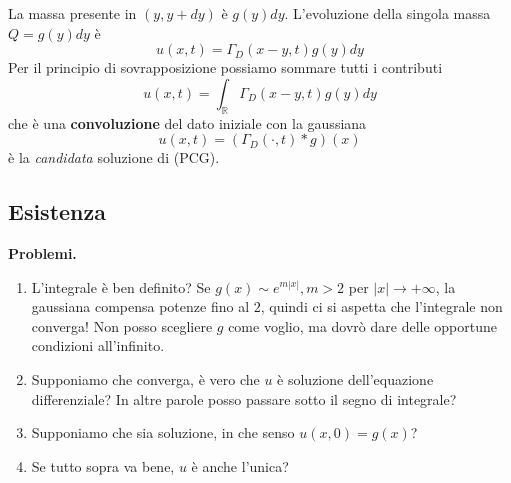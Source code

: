 \documentclass[10pt,a4paper,twoside,openright]{book}
\begin{document}
La massa presente in $(y,y+dy)$ è $g(y) dy$. L'evoluzione della singola massa $Q=g(y) dy$ è
\begin{equation*}
u(x,t) =\Gamma _{D}(x-y,t) g(y) dy
\end{equation*}
Per il principio di sovrapposizione possiamo sommare tutti i contributi
\begin{equation*}
u(x,t) =\int _{\mathbb{R}} \Gamma _{D}(x-y,t) g(y) dy
\end{equation*}
che è una \textbf{convoluzione} del dato iniziale con la gaussiana
\begin{equation*}
u(x,t) =( \Gamma _{D}(\cdotp,t) *g)(x)
\end{equation*}
è la \textit{candidata} soluzione di (PCG).
\subsection{Esistenza}

\textbf{Problemi.}
\begin{enumerate}
\item L'integrale è ben definito? Se $g(x) \sim e^{m| x| },m >2$ per $| x| \rightarrow +\infty $, la gaussiana compensa potenze fino al $2$, quindi ci si aspetta che l'integrale non converga! Non posso scegliere $g$ come voglio, ma dovrò dare delle opportune condizioni all'infinito.
\item Supponiamo che converga, è vero che $u$ è soluzione dell'equazione differenziale? In altre parole posso passare sotto il segno di integrale?
\item Supponiamo che sia soluzione, in che senso $u(x,0) =g(x)$?
\item Se tutto sopra va bene, $u$ è anche l'unica?
\end{enumerate}
\end{document}

